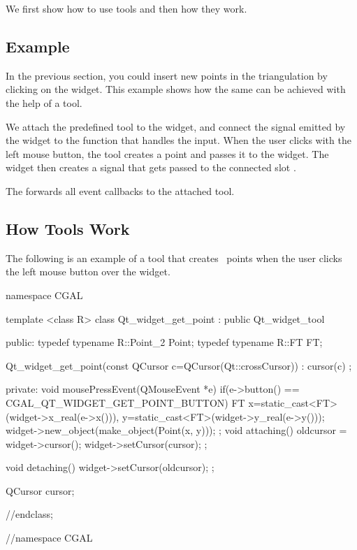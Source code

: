 We first show how to use tools and then how they work.

\subsection{Example}

In the previous section, you could insert new points in the
triangulation by clicking on the widget. This example shows how
the same can be achieved with the help of a tool.

We attach the predefined tool  to the widget,
and connect the signal emitted by the widget to the function that
handles the input.  When the user clicks with the left mouse button,
the tool creates a point and passes it to the widget. The widget then
creates a signal that gets passed to the connected slot
.


The  forwards all event callbacks to the attached tool.


\subsection{How Tools Work}

The following is an example of a tool that creates \cgal\ points when the user 
clicks the left mouse button over the widget. 
 
\begin{ccExampleCode}
namespace CGAL {

template <class R>
class Qt_widget_get_point : public Qt_widget_tool
{
public:
  typedef typename R::Point_2   Point;
  typedef typename R::FT        FT;
  
  Qt_widget_get_point(const QCursor c=QCursor(Qt::crossCursor)) :
    cursor(c) {};
  
private:
  void mousePressEvent(QMouseEvent *e)
  {
    if(e->button() == CGAL_QT_WIDGET_GET_POINT_BUTTON)
    {
      FT
        x=static_cast<FT>(widget->x_real(e->x())),
        y=static_cast<FT>(widget->y_real(e->y()));
      widget->new_object(make_object(Point(x, y)));
    }
  };
  void attaching()
  {
    oldcursor = widget->cursor();
    widget->setCursor(cursor);
  };
  
  void detaching()
  {
    widget->setCursor(oldcursor);
  };

  QCursor cursor;
}//endclass;
}//namespace CGAL
\end{ccExampleCode}

